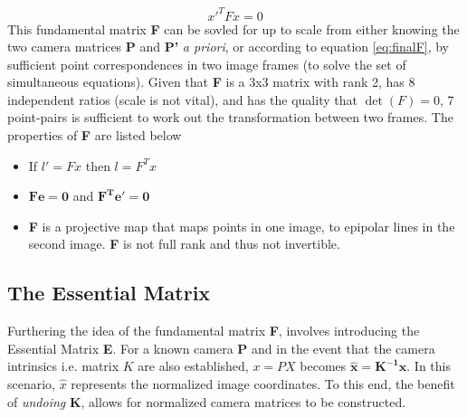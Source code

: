 \documentclass[12pt]{article}
\begin{document}
\begin{equation}
\label{eq:finalF}
x'^TFx = 0
\end{equation}
This fundamental matrix \textbf{F} can be sovled for up to scale from either knowing the two camera matrices \textbf{P} and \textbf{P'} \textit{a priori}, or according to equation \ref{eq:finalF}, by sufficient point correspondences in two image frames (to solve the set of simultaneous equations). Given that \textbf{F} is a 3x3 matrix with rank 2, has 8 independent ratios (scale is not vital), and has the quality that $\det(F )= 0$, 7 point-pairs is sufficient to work out the transformation between two frames. %
The properties of \textbf{F} are listed below
\begin{itemize}
\item If $l' = Fx$ then $l = F^{T}x$
\item $\mathbf{Fe = 0}$ and $\mathbf{F^Te'=0}$
\item \textbf{F} is a projective map that maps points in one image, to epipolar lines in the second image. \textbf{F} is not full rank and thus not invertible.
\end{itemize}

\subsection{The Essential Matrix}
Furthering the idea of the fundamental matrix \textbf{F}, involves introducing the Essential Matrix \textbf{E}. For a known camera \textbf{P} and in the event that the camera intrinsics i.e. matrix $K$ are also established, $x = PX$ becomes $\mathbf{\hat{x}=K^{-1}x }$. In this scenario, $\hat{x}$ represents the normalized image coordinates. To this end, the benefit of \textit{undoing} \textbf{K}, allows for normalized camera matrices to be constructed. 
\end{document}
